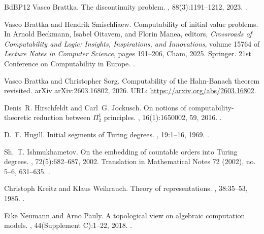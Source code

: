 \documentclass[11pt,a4paper]{amsart}
\theoremstyle{plain}
\theoremstyle{definition}
\theoremstyle{defC}
\theoremstyle{thmC}
\theoremstyle{plain}
\numberwithin{equation}{section}
\begin{document}
\begin{thebibliography}{BdBP12}
Vasco Brattka.
\newblock The discontinuity problem.
, 88(3):1191--1212, 2023.
\newblock \href {https://doi.org/10.1017/jsl.2021.106}
  {}.

Vasco Brattka and Hendrik Smischliaew.
\newblock Computability of initial value problems.
\newblock In Arnold Beckmann, Isabel Oitavem, and Florin Manea, editors, {\em
  Crossroads of Computability and Logic: Insights, Inspirations, and
  Innovations}, volume 15764 of {\em Lecture Notes in Computer Science}, pages
  191--206, Cham, 2025. Springer.
\newblock 21st Conference on Computability in Europe.
\newblock \href {https://doi.org/10.1007/978-3-031-95908-0_14}
  {}.

Vasco Brattka and Christopher Sorg.
\newblock Computability of the {H}ahn-{B}anach theorem revisited.
\newblock arXiv arXiv:2603.16802, 2026.
\newblock URL: \url{https://arxiv.org/abs/2603.16802}.

Denis~R. Hirschfeldt and Carl~G. Jockusch.
\newblock On notions of computability-theoretic reduction between {$\Pi_2^1$}
  principles.
, 16(1):1650002, 59, 2016.
\newblock \href {https://doi.org/10.1142/S0219061316500021}
  {}.

D.~F. Hugill.
\newblock Initial segments of {T}uring degrees.
, 19:1--16, 1969.
\newblock \href {https://doi.org/10.1112/plms/s3-19.1.1}
  {}.

Sh.~T. Ishmukhametov.
\newblock On the embedding of countable orders into {T}uring degrees.
, 72(5):682--687, 2002.
\newblock Translation in {M}athematical {N}otes 72 (2002), no. 5--6, 631--635.
\newblock \href {https://doi.org/10.1023/A:1021400820931}
  {}.

Christoph Kreitz and Klaus Weihrauch.
\newblock Theory of representations.
, 38:35--53, 1985.
\newblock \href {https://doi.org/10.1016/0304-3975(85)90208-7}
  {}.

Eike Neumann and Arno Pauly.
\newblock A topological view on algebraic computation models.
, 44(Supplement C):1--22, 2018.
\newblock \href {https://doi.org/10.1016/j.jco.2017.08.003}
  {}.


\end{thebibliography}
\end{document}
